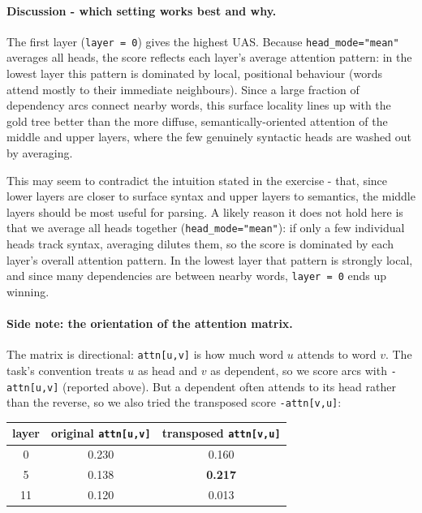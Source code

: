 \documentclass[11pt]{article}
\begin{document}
\paragraph{Discussion - which setting works best and why.}
The first layer (\texttt{layer = 0}) gives the highest UAS. Because
\texttt{head\_mode="mean"} averages all heads, the score reflects each
layer's average attention pattern: in the lowest layer this pattern is
dominated by local, positional behaviour (words attend mostly to their
immediate neighbours). Since a large fraction of dependency arcs connect
nearby words, this surface locality lines up with the gold tree better than
the more diffuse, semantically-oriented attention of the middle and upper
layers, where the few genuinely syntactic heads are washed out by averaging.

This may seem to contradict the intuition stated in the exercise - that,
since lower layers are closer to surface syntax and upper layers to
semantics, the middle layers should be most useful for parsing. A likely
reason it does not hold here is that we average all heads together
(\texttt{head\_mode="mean"}): if only a few individual heads track syntax,
averaging dilutes them, so the score is dominated by each layer's overall
attention pattern. In the lowest layer that pattern is strongly local, and
since many dependencies are between nearby words, \texttt{layer = 0} ends up
winning.

\paragraph{Side note: the orientation of the attention matrix.}
The matrix is directional: \texttt{attn[u,v]} is how much word $u$ attends to
word $v$. The task's convention treats $u$ as head and $v$ as dependent, so we
score arcs with \texttt{-attn[u,v]} (reported above). But a dependent often
attends to its head rather than the reverse, so we also tried the transposed
score \texttt{-attn[v,u]}:

\begin{center}
\begin{tabular}{ccc}
\toprule
layer & original \texttt{attn[u,v]} & transposed \texttt{attn[v,u]} \\
\midrule
0  & 0.230 & 0.160 \\
5  & 0.138 & \textbf{0.217} \\
11 & 0.120 & 0.013 \\
\bottomrule
\end{tabular}
\end{center}
\end{document}
